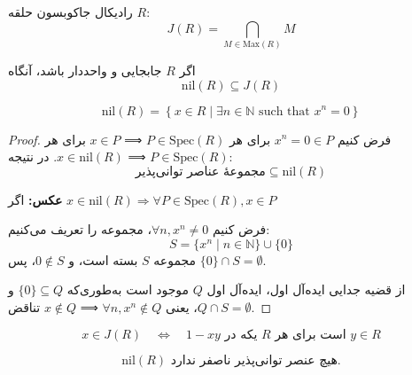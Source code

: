 \begin{tcolorbox}[colframe=black, coltitle=black, title=تعریف]
    رادیکال جاکوبسون حلقه \( R \):
    \[
        J(R) = \bigcap_{M \in \mathrm{Max}(R)} M
    \]
\end{tcolorbox}

\begin{remark}
    اگر \( R \) جابجایی و واحددار باشد، آنگاه
    \[
        \mathrm{nil}(R) \subseteq J(R)
    \]
\end{remark}

\begin{tcolorbox}[colframe=black, coltitle=black, title=تعریف]
    \[
        \mathrm{nil}(R) = \left\{ x \in R \mid \exists n \in \mathbb{N} \text{ such that } x^n = 0 \right\}
    \]
\end{tcolorbox}

\begin{proof}
    فرض کنیم \( x^n = 0 \in P \) برای هر \( P \in \mathrm{Spec}(R) \) ⟹ \( x \in P \) برای هر \( P \in \mathrm{Spec}(R) \) ⟹ \( x \in \mathrm{nil}(R) \). در نتیجه:
    \[
        \text{مجموعهٔ عناصر توانی‌پذیر} \subseteq \mathrm{nil}(R)
    \]

    \textbf{عکس:} اگر \( x \in \mathrm{nil}(R) \Rightarrow \forall P \in \mathrm{Spec}(R), x \in P \)

    فرض کنیم \( \forall n, x^n \ne 0 \)، مجموعه را تعریف می‌کنیم:
    \[
        S = \{ x^n \mid n \in \mathbb{N} \} \cup \{0\}
    \]
    مجموعه \( S \) بسته‌ است، و \( 0 \notin S \)، پس \( \{0\} \cap S = \emptyset \).

    از قضیه جدایی ایده‌آل اول، ایده‌آل اول \( Q \) موجود است به‌طوری‌که \( \{0\} \subseteq Q \) و \( Q \cap S = \emptyset \)، یعنی \( \forall n, x^n \notin Q \) ⟹ \( x \notin Q \) تناقض.
\end{proof}

\begin{tcolorbox}[colframe=black, coltitle=black, title=تمرین]
    \[
        x \in J(R) \quad \Leftrightarrow \quad 1 - xy \text{ یکه در } R \text{ است برای هر } y \in R
    \]
\end{tcolorbox}

\begin{tcolorbox}[colframe=black, coltitle=black, title=تمرین]
    \[
        \mathrm{nil}(R) \text{ هیچ عنصر توانی‌پذیر ناصفر ندارد}.
    \]
\end{tcolorbox}

